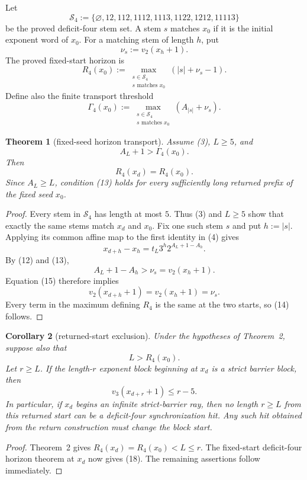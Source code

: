 \documentclass[11pt]{article}
\newtheorem{theorem}{Theorem}
\newtheorem{corollary}[theorem]{Corollary}
\begin{document}
Let
\[
  \mathcal S_4:=
  \{\varnothing,12,112,1112,1113,1122,1212,11113\}
  \tag{9}
\]
be the proved deficit-four stem set.  A stem $s$ matches $x_0$ if it is the
initial exponent word of $x_0$.  For a matching stem of length $h$, put
\[
  \nu_s:=v_2(x_h+1).
  \tag{10}
\]
The proved fixed-start horizon is
\[
  R_4(x_0):=
  \max_{\substack{s\in\mathcal S_4\\s\text{ matches }x_0}}
  (|s|+\nu_s-1).
  \tag{11}
\]
Define also the finite transport threshold
\[
  \Gamma_4(x_0):=
  \max_{\substack{s\in\mathcal S_4\\s\text{ matches }x_0}}
  (A_{|s|}+\nu_s).
  \tag{12}
\]

\begin{theorem}[fixed-seed horizon transport]
Assume (3), $L\geq5$, and
\[
  A_L+1>\Gamma_4(x_0).
  \tag{13}
\]
Then
\[
\boxed{R_4(x_d)=R_4(x_0).}
\tag{14}
\]
Since $A_L\geq L$, condition (13) holds for every sufficiently long returned
prefix of the fixed seed $x_0$.
\end{theorem}

\begin{proof}
Every stem in $\mathcal S_4$ has length at most $5$.  Thus (3) and $L\geq5$
show that exactly the same stems match $x_d$ and $x_0$.  Fix one such stem
$s$ and put $h:=|s|$.  Applying its common affine map to the first identity
in (4) gives
\[
  x_{d+h}-x_h=t_L3^h2^{A_L+1-A_h}.
  \tag{15}
\]
By (12) and (13),
\[
  A_L+1-A_h>\nu_s=v_2(x_h+1).
\]
Equation (15) therefore implies
\[
  v_2(x_{d+h}+1)=v_2(x_h+1)=\nu_s.
  \tag{16}
\]
Every term in the maximum defining $R_4$ is the same at the two starts, so
(14) follows.
\end{proof}

\begin{corollary}[returned-start exclusion]
Under the hypotheses of Theorem~2, suppose also that
\[
  L>R_4(x_0).
  \tag{17}
\]
Let $r\geq L$.  If the length-$r$ exponent block beginning at $x_d$ is a
strict barrier block, then
\[
\boxed{
  v_3(x_{d+r}+1)\leq r-5.}
\tag{18}
\]
In particular, if $x_d$ begins an infinite strict-barrier ray, then no
length $r\geq L$ from this returned start can be a deficit-four
synchronization hit.  Any such hit obtained from the return construction
must change the block start.
\end{corollary}

\begin{proof}
Theorem~2 gives $R_4(x_d)=R_4(x_0)<L\leq r$.  The fixed-start deficit-four
horizon theorem at $x_d$ now gives (18).  The remaining assertions follow
immediately.
\end{proof}
\end{document}
